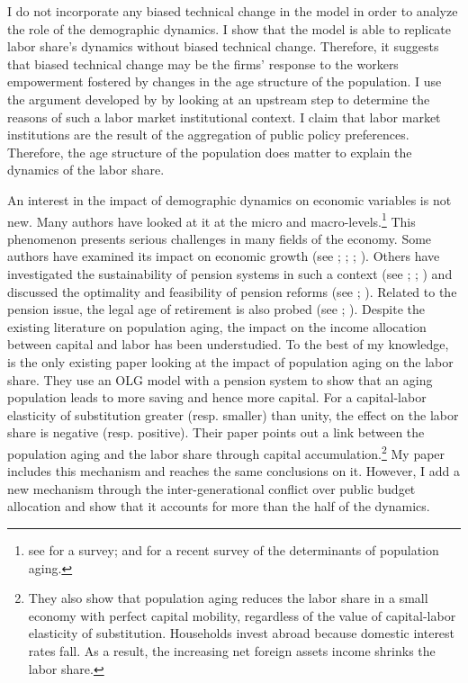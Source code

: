 I do not incorporate any biased technical change in the model in order to analyze the role of the demographic dynamics. I show that the model is able to replicate labor share's dynamics without biased technical change. Therefore, it suggests that biased technical change may be the firms' response to the workers empowerment fostered by changes in the age structure of the population. I use the argument developed by \cite{Caballero1998} by looking at an upstream step to determine the reasons of such a labor market institutional context. I claim that labor market institutions are the result of the aggregation of public policy preferences. Therefore, the age structure of the population does matter to explain the dynamics of the labor share.

An interest in the impact of demographic dynamics on economic variables is not new. Many authors have looked at it at the micro and macro-levels.\footnote{see \cite{Clark1978} for a survey; and \cite{Bloom2016} for a recent survey of the determinants of population aging.} 
This phenomenon presents serious challenges in many fields of the economy. Some authors have examined its impact on economic growth (see \citealt{VanGroezen2005}; \citealt{Soares2005}; \citealt{Bloom2010}; \citealt{Lee2010}). Others have investigated the sustainability of pension systems in such a context (see \citealt{Ono2003}; \citealt{DelaCroix2013}; \citealt{Philipov2014}) and discussed the optimality and feasibility of pension reforms (see \citealt{Pecchenino1997}; \citealt{Sinn2003}). Related to the pension issue, the legal age of retirement is also probed (see \citealt{Futagami2001}; \citealt{Dedry2017}). Despite the existing literature on population aging, the impact on the income allocation between capital and labor has been understudied. To the best of my knowledge, \cite{Schmidt2013} is the only existing paper looking at the impact of population aging on the labor share. They use an OLG model with a pension system to show that an aging population leads to more saving and hence more capital. For a capital-labor elasticity of substitution greater (resp. smaller) than unity, the effect on the labor share is negative (resp. positive). Their paper points out a link between the population aging and the labor share through capital accumulation.\footnote{They also show that population aging reduces the labor share in a small economy with perfect capital mobility, regardless of the value of capital-labor elasticity of substitution. Households invest abroad because domestic interest rates fall. As a result, the increasing net foreign assets income shrinks the labor share.} My paper includes this mechanism and reaches the same conclusions on it. However, I add a new mechanism through the inter-generational conflict over public budget allocation and show that it accounts for more than the half of the dynamics.

